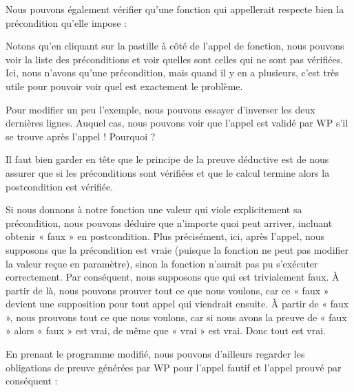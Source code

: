 

Nous pouvons également vérifier qu'une fonction qui appellerait 
respecte bien la précondition qu'elle impose :







Notons qu'en cliquant sur la pastille à côté de l'appel de fonction, nous
pouvons voir la liste des préconditions et voir quelles sont celles qui ne sont
pas vérifiées. Ici, nous n'avons qu'une précondition, mais quand il y en a
plusieurs, c'est très utile pour pouvoir voir quel est exactement le problème.




Pour modifier un peu l'exemple, nous pouvons essayer d'inverser les deux
dernières lignes. Auquel cas, nous pouvons voir que l'appel 
est validé par WP s'il se trouve après l'appel  !
Pourquoi ?



Il faut bien garder en tête que le principe de la preuve déductive est de nous
assurer que si les préconditions sont vérifiées et que le calcul termine alors
la postcondition est vérifiée.


Si nous donnons à notre fonction une valeur qui viole explicitement sa
précondition, nous pouvons déduire que n'importe quoi peut arriver, incluant
obtenir « faux » en postcondition. Plus précisément, ici, après l'appel, nous
supposons que la précondition est vraie (puisque la fonction ne peut pas
modifier la valeur reçue en paramètre), sinon la fonction n'aurait pas pu
s'exécuter correctement. Par conséquent, nous supposons que
 qui est trivialement faux. À partir de là,
nous pouvons  prouver tout ce que nous voulons, car ce « faux » devient une
supposition pour tout appel qui viendrait ensuite. À partir de « faux », nous
prouvons tout ce que
nous voulons, car si nous avons la preuve de « faux » alors « faux » est vrai,
de même que « vrai » est vrai. Donc tout est vrai.



En prenant le programme modifié, nous pouvons d'ailleurs regarder les obligations
de preuve générées par WP pour l'appel fautif et l'appel prouvé par conséquent :





